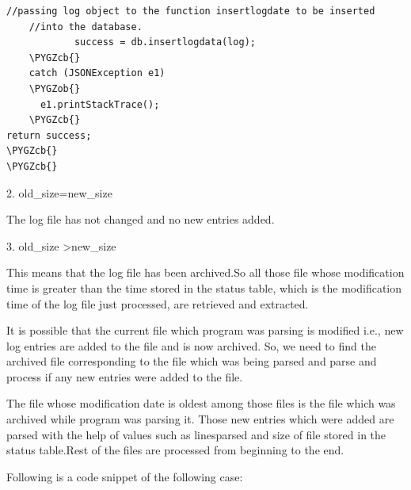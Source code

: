 \documentclass[a4paper,12pt,oneside]{sphinxmanual}
\def\PYGZob{\char`\{}
\def\PYGZcb{\char`\}}
\begin{document}
\begin{Verbatim}[commandchars=\\\{\}]
    //passing log object to the function insertlogdate to be inserted
    //into the database.
            success = db.insertlogdata(log);
    \PYGZcb{}
    catch (JSONException e1)
    \PYGZob{}
      e1.printStackTrace();
    \PYGZcb{}
return success;
\PYGZcb{}
\PYGZcb{}
\end{Verbatim}

\begin{DUlineblock}{0em}
\item[] 2. old\_size=new\_size
\end{DUlineblock}

\begin{DUlineblock}{0em}
\item[] The log file has not changed and no new entries added.
\end{DUlineblock}

\begin{DUlineblock}{0em}
\item[] 3. old\_size \textgreater{}new\_size
\end{DUlineblock}

\begin{DUlineblock}{0em}
\item[] This means that the log file has been archived.So all those file whose modification time is greater than the time stored in the status table, which is the modification time of the log file just processed, are retrieved and extracted.
\item[] It is possible that the current file which program was parsing is modified i.e., new log entries are added to the file and is now archived. So, we need to find the archived file corresponding to the file which was being parsed and parse and process if any new entries were added to the file.
\item[] The file whose modification date is oldest among those files is the file which was archived while program was parsing it. Those new entries which were added are parsed with the help of values such as linesparsed and size of file stored in the status table.Rest of the files are processed from beginning to the end.
\end{DUlineblock}

Following is a code snippet of the following case:
\end{document}
